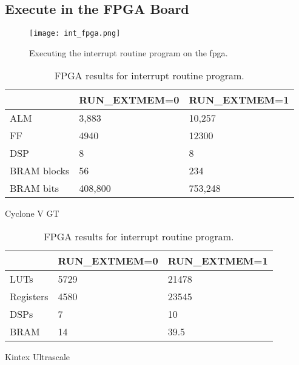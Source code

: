 \subsection{Execute in the FPGA Board}

\begin{figure}[!ht]
    \centering
    \texttt{[image: int\_fpga.png]}
    \caption{Executing the interrupt routine program on the \acrshort{fpga}.}
    \label{fig:int_fpga}
\end{figure}

\begin{table}[h]
    \begin{subtable}[h]{0.45\textwidth}
        \centering
        \begin{tabular}{l|l|l|}
            \cline{2-3}
                                              & RUN\_EXTMEM=0 & RUN\_EXTMEM=1 \\ \hline
            \multicolumn{1}{|l|}{ALM}         & 3,883         & 10,257        \\ \hline
            \multicolumn{1}{|l|}{FF}          & 4940          & 12300         \\ \hline
            \multicolumn{1}{|l|}{DSP}         & 8             & 8             \\ \hline
            \multicolumn{1}{|l|}{BRAM blocks} & 56            & 234           \\ \hline
            \multicolumn{1}{|l|}{BRAM bits}   & 408,800       & 753,248       \\ \hline
        \end{tabular}
       \caption{Cyclone V GT}
       \label{tab:cyclone_int}
    \end{subtable}
    \hfill
    \begin{subtable}[h]{0.45\textwidth}
        \centering
        \begin{tabular}{l|l|l|}
            \cline{2-3}
                                            & RUN\_EXTMEM=0 & RUN\_EXTMEM=1 \\ \hline
            \multicolumn{1}{|l|}{LUTs}      & 5729          & 21478         \\ \hline
            \multicolumn{1}{|l|}{Registers} & 4580          & 23545         \\ \hline
            \multicolumn{1}{|l|}{DSPs}      & 7             & 10             \\ \hline
            \multicolumn{1}{|l|}{BRAM}      & 14            & 39.5          \\ \hline
        \end{tabular}
        \caption{Kintex Ultrascale}
        \label{tab:kintex_int}
     \end{subtable}
     \caption{FPGA results for interrupt routine program.}
     \label{tab:fpga_int}
\end{table}


